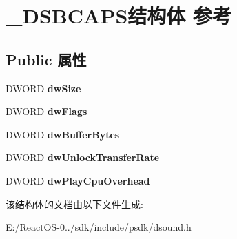 \hypertarget{struct___d_s_b_c_a_p_s}{}\section{\+\_\+\+D\+S\+B\+C\+A\+P\+S结构体 参考}
\label{struct___d_s_b_c_a_p_s}
\subsection*{Public 属性}
\begin{DoxyCompactItemize}
\item 
\mbox{\label{struct___d_s_b_c_a_p_s_af66219aaeaa8ed8848b0a386d11dc8a4}} 
D\+W\+O\+RD {\bfseries dw\+Size}
\item 
\mbox{\label{struct___d_s_b_c_a_p_s_abf22aa93ff6d9d3ec398f1ed08d0df34}} 
D\+W\+O\+RD {\bfseries dw\+Flags}
\item 
\mbox{\label{struct___d_s_b_c_a_p_s_a8d4f89242bffa5876cde94d24f997c7e}} 
D\+W\+O\+RD {\bfseries dw\+Buffer\+Bytes}
\item 
\mbox{\label{struct___d_s_b_c_a_p_s_a0be7befbb74d2377d90fa18644ffcf71}} 
D\+W\+O\+RD {\bfseries dw\+Unlock\+Transfer\+Rate}
\item 
\mbox{\label{struct___d_s_b_c_a_p_s_a21ba1c00e6d925f55b042f10a1ca9e55}} 
D\+W\+O\+RD {\bfseries dw\+Play\+Cpu\+Overhead}
\end{DoxyCompactItemize}


该结构体的文档由以下文件生成\+:\begin{DoxyCompactItemize}
\item 
E\+:/\+React\+O\+S-\/0../sdk/include/psdk/dsound.\+h\end{DoxyCompactItemize}
